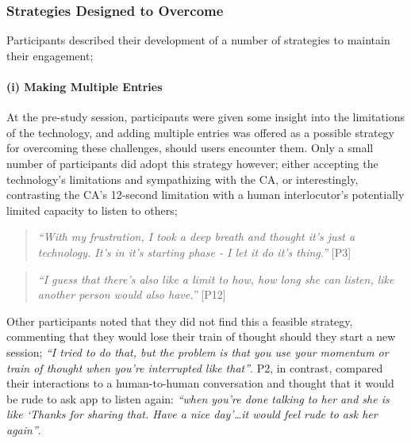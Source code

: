         \subsubsection{Strategies Designed to Overcome}
        
            Participants described their development of a number of strategies to maintain their engagement;
            
            \paragraph{(i) Making Multiple Entries} %
        
                At the pre-study session, participants were given some insight into the limitations of the technology, and adding multiple entries was offered as a possible strategy for overcoming these challenges, should users encounter them. Only a small number of participants did adopt this strategy however; either accepting the technology's limitations and sympathizing with the CA, or interestingly, contrasting the \ac{CA}'s 12-second limitation with a human interlocutor's potentially limited capacity to listen to others;
                
                    \begin{quote}
                    \vspace{2mm}
                        \textit{``With my frustration, I took a deep breath and thought it’s just a technology. It’s in it’s starting phase - I let it do it’s thing.''} [P3]
                    \vspace{2mm}
                    \end{quote}
                    
                    \begin{quote}
                    \vspace{2mm}
                        \textit{``I guess that there's also like a limit to how, how long she can listen, like another person would also have.''} [P12]
                    \vspace{2mm}
                    \end{quote}
                
               Other participants noted that they did not find this a feasible strategy, commenting that they would lose their train of thought should they start a new session; \textit{``I tried to do that, but the problem is that you use your momentum or train of thought when you're interrupted like that''}. P2, in contrast, compared their interactions to a human-to-human conversation and thought that it would be rude to ask \acl{app} to listen again: \textit{``when you're done talking to her and she is like `Thanks for sharing that. Have a nice day'\ldots it would feel rude to ask her again''}.

